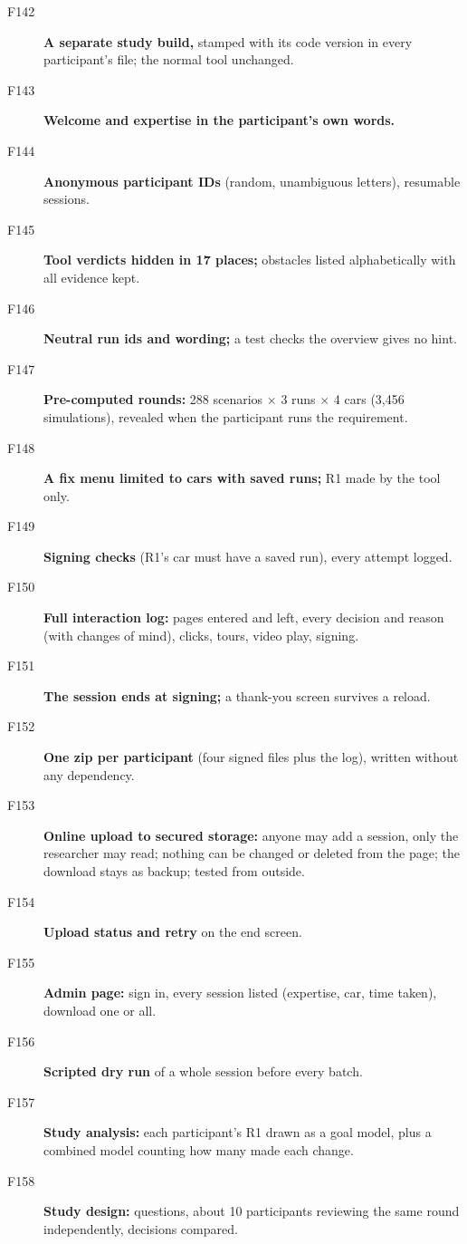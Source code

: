 \begin{description}
\item[F142] \textbf{A separate study build,} stamped with its code version in every participant's file; the normal tool unchanged. \tagstudy
\item[F143] \textbf{Welcome and expertise in the participant's own words.} \tagstudy
\item[F144] \textbf{Anonymous participant IDs} (random, unambiguous letters), resumable sessions. \tagstudy
\item[F145] \textbf{Tool verdicts hidden in 17 places;} obstacles listed alphabetically with all evidence kept. \tagstudy
\item[F146] \textbf{Neutral run ids and wording;} a test checks the overview gives no hint. \tagstudy
\item[F147] \textbf{Pre-computed rounds:} 288 scenarios $\times$ 3 runs $\times$ 4 cars (3{,}456 simulations), revealed when the participant runs the requirement. \tagstudy
\item[F148] \textbf{A fix menu limited to cars with saved runs;} R1 made by the tool only. \tagstudy
\item[F149] \textbf{Signing checks} (R1's car must have a saved run), every attempt logged. \tagstudy
\item[F150] \textbf{Full interaction log:} pages entered and left, every decision and reason (with changes of mind), clicks, tours, video play, signing. \tagstudy
\item[F151] \textbf{The session ends at signing;} a thank-you screen survives a reload. \tagstudy
\item[F152] \textbf{One zip per participant} (four signed files plus the log), written without any dependency. \tagstudy
\item[F153] \textbf{Online upload to secured storage:} anyone may add a session, only the researcher may read; nothing can be changed or deleted from the page; the download stays as backup; tested from outside. \tagstudy
\item[F154] \textbf{Upload status and retry} on the end screen. \tagstudy
\item[F155] \textbf{Admin page:} sign in, every session listed (expertise, car, time taken), download one or all. \tagstudy
\item[F156] \textbf{Scripted dry run} of a whole session before every batch. \taginfra
\item[F157] \textbf{Study analysis:} each participant's R1 drawn as a goal model, plus a combined model counting how many made each change. \tagnew{} 
\item[F158] \textbf{Study design:} questions, about 10 participants reviewing the same round independently, decisions compared. \tagstudy {}
\end{description}

